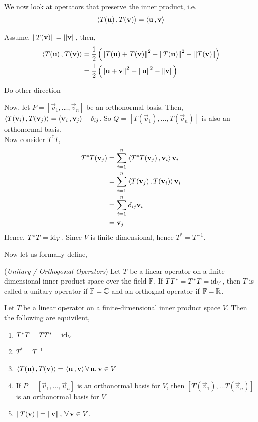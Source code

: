 \documentclass{article}
\begin{document}
We now look at operators that preserve the inner product, i.e.
$$ \ip{T(\vec u)}{T(\vec v)} = \ip{\vec u}{\vec v} $$

\noindent
Assume, $\displaystyle{\norm{T(\vec v)} = \norm{\vec v}}$, then,
\begin{align*}
  \ip{T(\vec u)}{T(\vec v)} &= \frac{1}{2}\left( \norm{T(\vec u) + T(\vec v)}^2 - \norm{T(\vec u)}^2 - \norm{T(\vec v)} \right)\\
  &= \frac{1}{2}\left( \norm{\vec u + \vec v}^2 - \norm{\vec u}^2 - \norm{\vec v} \right)\\
\end{align*}

\begin{exe}
  Do other direction
\end{exe}

\noindent
Now, let $P = [\vec v_1, \dots, \vec v_n]$ be an orthonormal basis. Then, $\displaystyle{\ip{T(\vec v_i)}{T(\vec v_j)} = \ip{\vec v_i}{\vec v_j} - \delta_{ij}}$. So $\displaystyle{Q = [T(\vec v_1), \dots, T(\vec v_n)]}$ is also an orthonormal basis.\\

\noindent
Now consider $T^*T$,
\begin{align*}
  T^*T(\vec v_j) &= \sum_{i=1}^n \ip{T^*T(\vec v_j)}{\vec v_i}\vec v_i\\
  &= \sum_{i=1}^n \ip{T(\vec v_j)}{T(\vec v_i)}\vec v_i\\
  &= \sum_{i=1}^n \delta_{ij}\vec v_i\\
  &= \vec v_j
\end{align*}
Hence, $T^*T = \id_V$. Since $V$ is finite dimensional, hence $T^* = T^{-1}$.

Now let us formally define,

\begin{ndefi}{(\textit{Unitary / Orthogonal Operators})}
  Let $T$ be a linear operator on a finite-dimensional inner product space over the field $\F$. If $TT^* = T^*T = \id_V$, then $T$ is called a unitary operator if $\F = \C$ and an orthognal operator if $\F = \R$.
\end{ndefi}

\begin{nthm}
  Let $T$ be a linear operator on a finite-dimensional inner product space $V$. Then the following are equivilent,
  \begin{enumerate}
    \item $T^*T = TT^* = \id_V$
    \item $T^* = T^{-1}$
    \item $\ip{T(\vec u)}{T(\vec v)} = \ip{\vec u}{\vec v} \fa \vec u, \vec v \in V$
    \item If $P = [\vec v_1, \dots, \vec v_n]$ is an orthonormal basis for $V$, then $[T(\vec v_1), \dots T(\vec v_n)]$ is an orthonormal basis for $V$
    \item $\norm{T(\vec v)} = \norm{\vec v},\, \fa \vec v \in V$.
  \end{enumerate}
\end{nthm}
\end{document}
